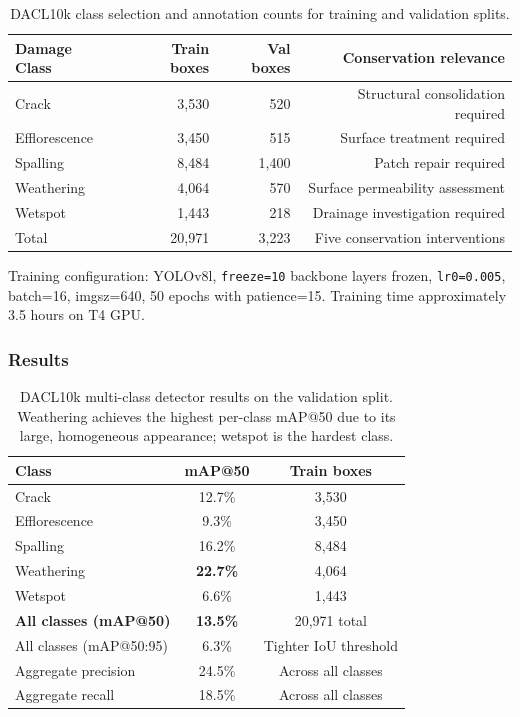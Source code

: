 \documentclass[12pt,a4paper]{article}
\begin{document}
\begin{table}[H]
\centering
\caption{DACL10k class selection and annotation counts for training and validation splits.}
\label{tab:dacl_classes}
\begin{tabular}{lrrr}
\toprule
\rowcolor{white}
\textbf{Damage Class} & \textbf{Train boxes} & \textbf{Val boxes} & \textbf{Conservation relevance} \\
\midrule
Crack & 3,530 & 520 & Structural consolidation required \\
Efflorescence & 3,450 & 515 & Surface treatment required \\
Spalling & 8,484 & 1,400 & Patch repair required \\
Weathering & 4,064 & 570 & Surface permeability assessment \\
Wetspot & 1,443 & 218 & Drainage investigation required \\
\midrule
Total & 20,971 & 3,223 & Five conservation interventions \\
\bottomrule
\end{tabular}
\end{table}

Training configuration: YOLOv8l, \texttt{freeze=10} backbone layers frozen, \texttt{lr0=0.005}, batch=16, imgsz=640, 50 epochs with patience=15. Training time approximately 3.5 hours on T4 GPU.

\subsubsection{Results}

\begin{table}[H]
\centering
\caption{DACL10k multi-class detector results on the validation split. Weathering achieves the highest per-class mAP@50 due to its large, homogeneous appearance; wetspot is the hardest class.}
\label{tab:dacl}
\begin{tabular}{lcc}
\toprule
\rowcolor{white}
\textbf{Class} & \textbf{mAP@50} & \textbf{Train boxes} \\
\midrule
Crack & 12.7\% & 3,530 \\
Efflorescence & 9.3\% & 3,450 \\
Spalling & 16.2\% & 8,484 \\
Weathering & \textbf{22.7\%} & 4,064 \\
Wetspot & 6.6\% & 1,443 \\
\midrule
\textbf{All classes (mAP@50)} & \textbf{13.5\%} & 20,971 total \\
All classes (mAP@50:95) & 6.3\% & Tighter IoU threshold \\
Aggregate precision & 24.5\% & Across all classes \\
Aggregate recall & 18.5\% & Across all classes \\
\bottomrule
\end{tabular}
\end{table}
\end{document}
